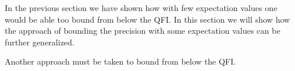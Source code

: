 In the previous section we have shown how with few expectation values one would be able too bound from below the QFI. In this section we will show how the approach of bounding the precision with some expectation values can be further generalized.

Another approach must be taken to bound from below the QFI.
